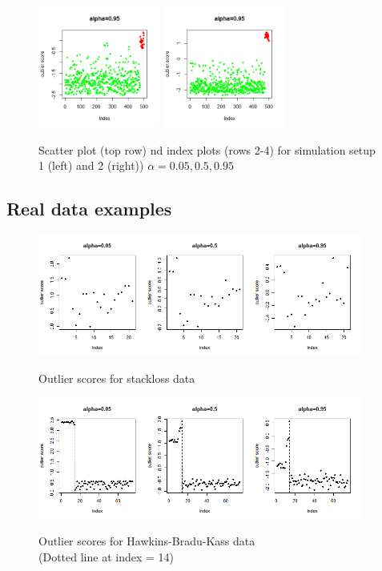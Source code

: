 \documentclass[10pt]{article}
\begin{document}
\begin{figure}[h]
		\includegraphics[height=4cm]{outlier_sim14.png}
		\includegraphics[height=4cm]{outlier_sim24.png}\\
	\label{fig:fig2}
	\caption{Scatter plot (top row) nd index plots (rows 2-4) for simulation setup 1 (left) and 2 (right)) $\alpha = 0.05, 0.5, 0.95$}
\end{figure}

\subsection{Real data examples}

\begin{figure}[t]
	\centering
		\includegraphics[height=4cm]{outlier_stackloss.png}\\
	\label{fig:fig4}
	\caption{Outlier scores for stackloss data}
\end{figure}

\begin{figure}[t]
	\centering
		\includegraphics[height=4cm]{outlier_hbk.png}\\
	\label{fig:fig5}
	\caption{Outlier scores for Hawkins-Bradu-Kass data \\(Dotted line at index = 14)}
\end{figure}
\end{document}
